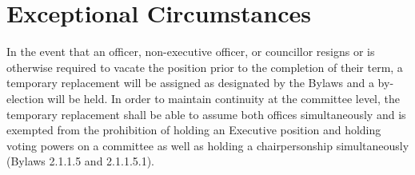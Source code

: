 \section{Exceptional Circumstances}
In the event that an officer, non-executive officer, or councillor resigns or is otherwise required to vacate the position prior to the completion of their term, a temporary replacement will be assigned as designated by the Bylaws and a by-election will be held. In order to maintain continuity at the committee level, the temporary replacement shall be able to assume both offices simultaneously and is exempted from the prohibition of holding an Executive position and holding voting powers on a committee as well as holding a chairpersonship simultaneously (Bylaws 2.1.1.5 and 2.1.1.5.1).

